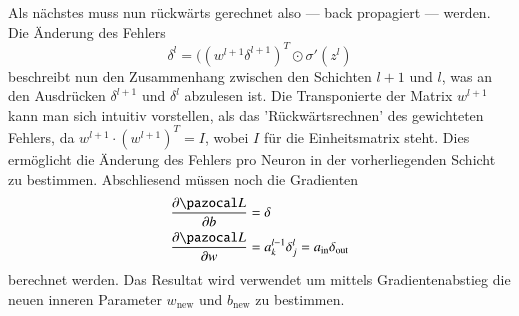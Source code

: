 Als nächstes muss nun rückwärts gerechnet also --- back propagiert --- werden. Die Änderung des Fehlers
\begin{equation}
\delta^{l} = ((w^{l+1} \delta^{l+1})^T \odot \sigma'(z^l)
\end{equation}
beschreibt nun den Zusammenhang zwischen den Schichten $l+1$ und $l$, was an den Ausdrücken $\delta^{l+1}$ und $ \delta^{l}$ abzulesen ist. Die Transponierte der Matrix $w^{l+1}$ kann man sich intuitiv vorstellen, als das 'Rückwärtsrechnen' des gewichteten Fehlers, da $w^{l+1} \cdot (w^{l+1})^T = I$, wobei $I$ für die Einheitsmatrix steht. Dies ermöglicht die Änderung des Fehlers pro Neuron in der vorherliegenden Schicht zu bestimmen. Abschliesend müssen noch die Gradienten
\begin{equation}
\begin{split}
\frac{\partial \Lb}{\partial b} & = \delta \\
\frac{\partial \Lb}{\partial w} & = a^{l-1}_{k} \delta^{l}_j = a_{\text{in}} \delta_{\text{out}}
\end{split}
\end{equation}
berechnet werden. Das Resultat wird verwendet um mittels Gradientenabstieg die neuen inneren Parameter $w_\text{new}$ und $b_\text{new}$ zu bestimmen.